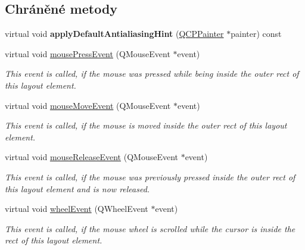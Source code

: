 \subsection*{Chráněné metody}
\begin{DoxyCompactItemize}
\item 
\hypertarget{classQCPColorScale_a23d530c340c15d2fce6583e7120ee8bd}{}virtual void {\bfseries apply\+Default\+Antialiasing\+Hint} (\hyperlink{classQCPPainter}{Q\+C\+P\+Painter} $\ast$painter) const \label{classQCPColorScale_a23d530c340c15d2fce6583e7120ee8bd}

\item 
\hypertarget{classQCPColorScale_a5df6ad81b2ad045878d276c2d5be7120}{}virtual void \hyperlink{classQCPColorScale_a5df6ad81b2ad045878d276c2d5be7120}{mouse\+Press\+Event} (Q\+Mouse\+Event $\ast$event)\label{classQCPColorScale_a5df6ad81b2ad045878d276c2d5be7120}

\begin{DoxyCompactList}\small\item\em This event is called, if the mouse was pressed while being inside the outer rect of this layout element. \end{DoxyCompactList}\item 
\hypertarget{classQCPColorScale_a3aca469d531ce7b5882de73590aa0de6}{}virtual void \hyperlink{classQCPColorScale_a3aca469d531ce7b5882de73590aa0de6}{mouse\+Move\+Event} (Q\+Mouse\+Event $\ast$event)\label{classQCPColorScale_a3aca469d531ce7b5882de73590aa0de6}

\begin{DoxyCompactList}\small\item\em This event is called, if the mouse is moved inside the outer rect of this layout element. \end{DoxyCompactList}\item 
\hypertarget{classQCPColorScale_a0916613d20901950fc6d00c6f99fe0a1}{}virtual void \hyperlink{classQCPColorScale_a0916613d20901950fc6d00c6f99fe0a1}{mouse\+Release\+Event} (Q\+Mouse\+Event $\ast$event)\label{classQCPColorScale_a0916613d20901950fc6d00c6f99fe0a1}

\begin{DoxyCompactList}\small\item\em This event is called, if the mouse was previously pressed inside the outer rect of this layout element and is now released. \end{DoxyCompactList}\item 
\hypertarget{classQCPColorScale_ab398e14c01240f3dc855884fe9e1ee8c}{}virtual void \hyperlink{classQCPColorScale_ab398e14c01240f3dc855884fe9e1ee8c}{wheel\+Event} (Q\+Wheel\+Event $\ast$event)\label{classQCPColorScale_ab398e14c01240f3dc855884fe9e1ee8c}

\begin{DoxyCompactList}\small\item\em This event is called, if the mouse wheel is scrolled while the cursor is inside the rect of this layout element. \end{DoxyCompactList}\end{DoxyCompactItemize}
